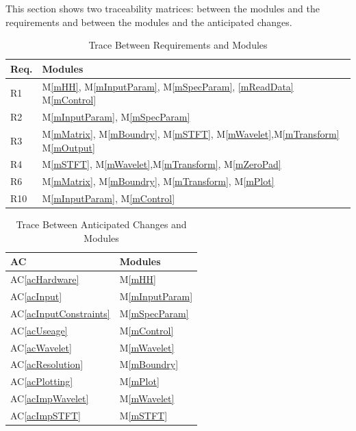 \documentclass[12pt, titlepage]{article}
\newcommand{\acref}[1]{AC\ref{#1}}
\newcommand{\mref}[1]{M\ref{#1}}
\begin{document}
This section shows two traceability matrices: between the modules and the
requirements and between the modules and the anticipated changes.

\begin{table}[H]
\centering
\begin{tabular}{p{} p{}}
\toprule
\textbf{Req.} & \textbf{Modules}\\
\midrule
R1 & \mref{mHH}, \mref{mInputParam}, \mref{mSpecParam}, \ref{mReadData} \mref{mControl}\\
R2 & \mref{mInputParam}, \mref{mSpecParam}\\
R3 & \mref{mMatrix}, \mref{mBoundry}, \mref{mSTFT}, \mref{mWavelet},\mref{mTransform} \mref{mOutput}\\
R4 &  \mref{mSTFT}, \mref{mWavelet},\mref{mTransform}, \mref{mZeroPad}\\
R6 &   \mref{mMatrix}, \mref{mBoundry}, \mref{mTransform}, \mref{mPlot}\\
R10 &  \mref{mInputParam}, \mref{mControl}\\

\end{tabular}
\caption{Trace Between Requirements and Modules}
\label{TblRT}
\end{table}

\begin{table}[H]
\centering
\begin{tabular}{p{} p{}}
\toprule
\textbf{AC} & \textbf{Modules}\\
\midrule
\acref{acHardware} & \mref{mHH}\\
\acref{acInput} & \mref{mInputParam}\\
\acref{acInputConstraints} & \mref{mSpecParam}\\
\acref{acUseage} & \mref{mControl}\\
\acref{acWavelet} & \mref{mWavelet}\\
\acref{acResolution} & \mref{mBoundry}\\
\acref{acPlotting} & \mref{mPlot}\\
\acref{acImpWavelet} & \mref{mWavelet}\\
\acref{acImpSTFT} & \mref{mSTFT}\\

\bottomrule
\end{tabular}
\caption{Trace Between Anticipated Changes and Modules}
\label{TblACT}
\end{table}
\end{document}
